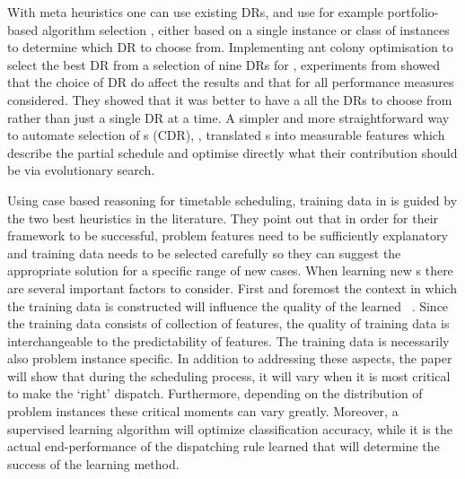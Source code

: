 \documentclass[twocolumn]{svjour3}
\begin{document}
With meta heuristics one can use existing DRs, and use for example 
portfolio-based algorithm selection \cite{Rice76,Gomes01,Xu07}, either based on 
a single instance or class of instances to determine which DR to choose from. 
Implementing ant colony optimisation to select the best DR 
from a selection of nine DRs for \JSP, experiments from \cite{Korytkowski13} 
showed that the choice of DR do affect the results and that for all performance 
measures considered. They showed that it was better to have a all the DRs to 
choose from rather than just a single DR at a time.
%
A simpler and more straightforward way to automate selection of \cdr s (CDR), 
\cite{InRu14}, translated \dr s into measurable features which describe the 
partial schedule and optimise directly what their contribution should be via 
evolutionary search. 

Using case based reasoning for timetable scheduling, training data in 
\cite{Burke06} is guided by the two best heuristics in the literature.
They point out that in order for their framework to be successful, problem 
features need to be sufficiently explanatory and training data needs to be 
selected carefully so they can suggest the appropriate solution for a specific 
range of new cases. 
%
When learning new \dr s there are several important 
factors to consider. First and foremost the context in which the training data 
is constructed 
will influence the quality of the learned \dr\ \cite{Burke06}. 
Since the training data consists of collection of features, the quality of 
training data is interchangeable to the predictability of features. 
The training data is necessarily also problem instance specific. %
In addition to addressing these aspects, the paper will show that during 
the scheduling process, it will vary when it is most critical to make 
the `right' dispatch. Furthermore, depending on the distribution of problem 
instances these critical moments can vary greatly. 
Moreover, a supervised learning algorithm will optimize classification 
accuracy, while it is the actual end-performance of the dispatching rule 
learned that will determine the success of the learning method. 
\end{document}
